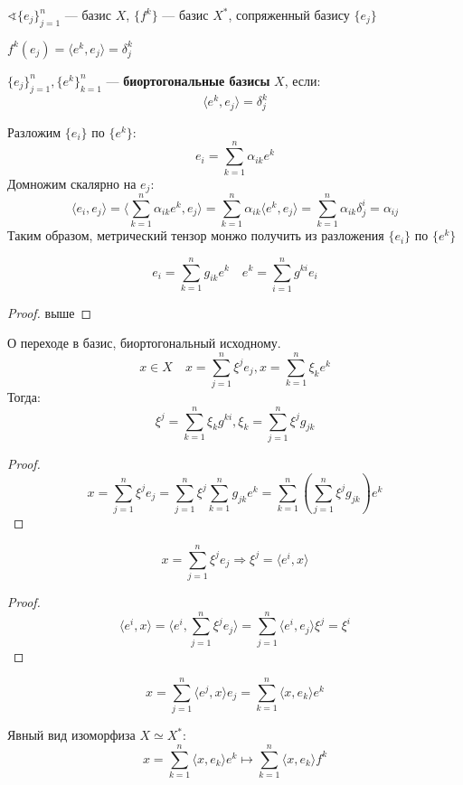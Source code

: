 $\sphericalangle \{e_j\}_{j=1}^n$ --- базис $X$, $\{f^k\}$ --- базис $X^*$, сопряженный базису $\{e_j\}$

$f^k(e_j)=\langle e^k, e_j\rangle = \delta_j^k$

\begin{definition}
    $\{e_j\}_{j=1}^n, \{e^k\}_{k=1}^n$ --- \textbf{биортогональные базисы} $X$, если:
    $$\langle e^k, e_j\rangle = \delta_j^k$$
\end{definition}

Разложим $\{e_i\}$ по $\{e^k\}$:
$$e_i=\sum_{k=1}^n \alpha_{ik} e^k$$
Домножим скалярно на $e_j$:
$$\langle e_i, e_j\rangle = \langle \sum_{k=1}^n \alpha_{ik} e^k, e_j\rangle=\sum_{k=1}^n \alpha_{ik} \langle e^k, e_j \rangle=\sum_{k=1}^n \alpha_{ik} \delta^i_j=\alpha_{ij}$$
Таким образом, метрический тензор монжо получить из разложения $\{e_i\}$ по $\{e^k\}$

\begin{lemma}
    $$e_i = \sum_{k=1}^n g_{ik}e^k \quad e^k = \sum_{i=1}^n g^{ki} e_i$$
\end{lemma}
\begin{proof}
    выше
\end{proof}

\begin{lemma}
    О переходе в базис, биортогональный исходному.
    $$x \in X \quad x = \sum_{j=1}^n \xi^j e_j, x = \sum_{k=1}^n \xi_k e^k$$
    Тогда:
    $$\xi^j = \sum_{k=1}^n \xi_k g^{ki}, \xi_k = \sum_{j=1}^n \xi^j g_{jk}$$
\end{lemma}
\begin{proof}
    $$x = \sum_{j=1}^n \xi^j e_j = \sum_{j=1}^n \xi^j \sum_{k=1}^n g_{jk}e^k = \sum_{k=1}^n \left(\sum_{j=1}^n \xi^j g_{jk}\right)e^k$$
\end{proof}

\begin{lemma}
    $$x = \sum_{j=1}^n \xi^j e_j \Rightarrow \xi^j = \langle e^i, x\rangle$$
\end{lemma}
\begin{proof}
    $$\langle e^i, x\rangle = \langle e^i, \sum_{j=1}^n \xi^j e_j\rangle = \sum_{j=1}^n \langle e^i, e_j\rangle\xi^j =\xi^i$$
\end{proof}

\begin{remark}
    $$x = \sum_{j=1}^n \langle e^j, x\rangle e_j = \sum_{k=1}^n \langle x, e_k\rangle e^k$$
\end{remark}

\begin{lemma}
    Явный вид изоморфиза $X\simeq X^*$:
    $$x = \sum_{k=1}^n \langle x, e_k\rangle e^k \mapsto \sum_{k=1}^n \langle x, e_k\rangle f^k$$
\end{lemma}

